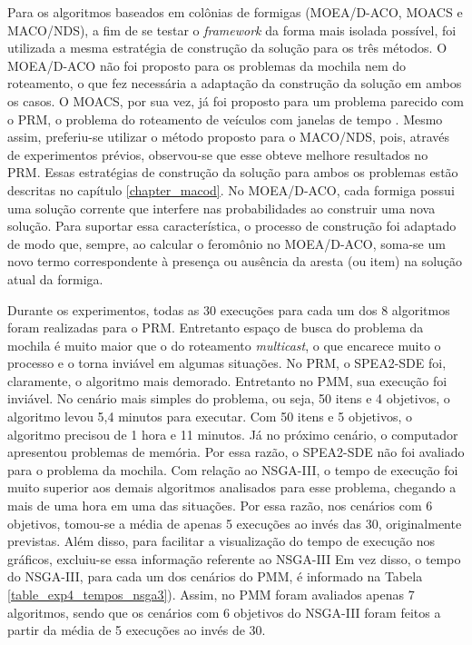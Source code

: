Para os algoritmos baseados em colônias de formigas (MOEA/D-ACO, MOACS e MACO/NDS), a fim de se testar o \textit{framework} da forma mais isolada possível, foi utilizada a mesma estratégia de construção da solução para os três métodos. O MOEA/D-ACO não foi proposto para os problemas da mochila nem do roteamento, o que fez necessária a adaptação da construção da solução em ambos os casos. O MOACS, por sua vez, já foi proposto para um problema parecido com o PRM, o problema do roteamento de veículos com janelas de tempo \cite{Baran2003}. Mesmo assim, preferiu-se utilizar o método proposto para o MACO/NDS, pois, através de experimentos prévios, observou-se que esse obteve melhore resultados no PRM. Essas estratégias de construção da solução para ambos os problemas estão descritas no capítulo \ref{chapter_macod}. No MOEA/D-ACO, cada formiga possui uma solução corrente que interfere nas probabilidades ao construir uma nova solução. Para suportar essa característica, o processo de construção foi adaptado de modo que, sempre, ao calcular o feromônio no MOEA/D-ACO, soma-se um novo termo correspondente à presença ou ausência da aresta (ou item) na solução atual da formiga.

Durante os experimentos, todas as 30 execuções para cada um dos 8 algoritmos foram realizadas para o PRM. Entretanto espaço de busca do problema da mochila é muito maior que o do roteamento \textit{multicast}, o que encarece muito o processo e o torna inviável em algumas situações. No PRM, o SPEA2-SDE foi, claramente, o algoritmo mais demorado. Entretanto no PMM, sua execução foi inviável. No cenário mais simples do problema, ou seja, 50 itens e 4 objetivos, o algoritmo levou 5,4 minutos para executar. Com 50 itens e 5 objetivos, o algoritmo precisou de 1 hora e 11 minutos. Já no próximo cenário, o computador apresentou problemas de memória. Por essa razão, o SPEA2-SDE não foi avaliado para o problema da mochila. Com relação ao NSGA-III, o tempo de execução foi muito superior aos demais algoritmos analisados para esse problema, chegando a mais de uma hora em uma das situações. Por essa razão, nos cenários com 6 objetivos, tomou-se a média de apenas 5 execuções ao invés das 30, originalmente previstas. Além disso, para facilitar a visualização do tempo de execução nos gráficos, excluiu-se essa informação referente ao NSGA-III Em vez disso, o tempo do NSGA-III, para cada um dos cenários do PMM, é informado na Tabela \ref{table_exp4_tempos_nsga3}). Assim, no PMM foram avaliados apenas 7 algoritmos, sendo que os cenários com 6 objetivos do NSGA-III foram feitos a partir da média de 5 execuções ao invés de 30.

